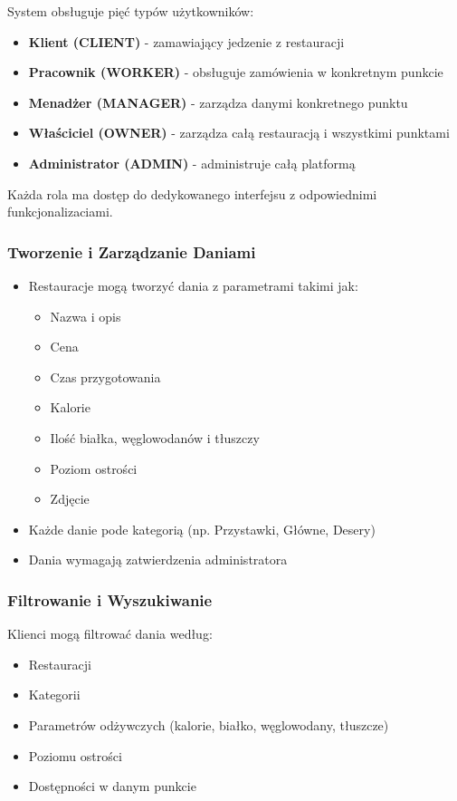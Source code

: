 \documentclass[12pt,a4paper,utf-8]{article}
\begin{document}
System obsługuje pięć typów użytkowników:
\begin{itemize}
    \item \textbf{Klient (CLIENT)} - zamawiający jedzenie z restauracji
    \item \textbf{Pracownik (WORKER)} - obsługuje zamówienia w konkretnym punkcie
    \item \textbf{Menadżer (MANAGER)} - zarządza danymi konkretnego punktu
    \item \textbf{Właściciel (OWNER)} - zarządza całą restauracją i wszystkimi punktami
    \item \textbf{Administrator (ADMIN)} - administruje całą platformą
\end{itemize}

Każda rola ma dostęp do dedykowanego interfejsu z odpowiednimi funkcjonalizaciami.

\subsubsection{Tworzenie i Zarządzanie Daniami}

\begin{itemize}
    \item Restauracje mogą tworzyć dania z parametrami takimi jak:
    \begin{itemize}
        \item Nazwa i opis
        \item Cena
        \item Czas przygotowania
        \item Kalorie
        \item Ilość białka, węglowodanów i tłuszczy
        \item Poziom ostrości
        \item Zdjęcie
    \end{itemize}
    \item Każde danie pode kategorią (np. Przystawki, Główne, Desery)
    \item Dania wymagają zatwierdzenia administratora
\end{itemize}

\subsubsection{Filtrowanie i Wyszukiwanie}

Klienci mogą filtrować dania według:
\begin{itemize}
    \item Restauracji
    \item Kategorii
    \item Parametrów odżywczych (kalorie, białko, węglowodany, tłuszcze)
    \item Poziomu ostrości
    \item Dostępności w danym punkcie
\end{itemize}
\end{document}
